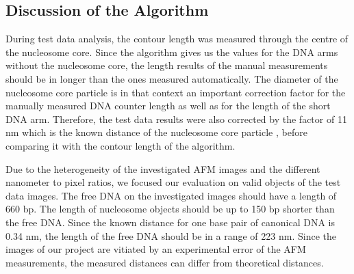\documentclass{article}
\begin{document}
\subsection{Discussion of the Algorithm}
During test data analysis, the contour length was measured through the centre of the nucleosome core. Since the algorithm gives us the values for the DNA arms without the nucleosome core, the length results of the manual measurements should be in longer than the ones measured automatically. The diameter of the nucleosome core particle is in that context an important correction factor for the manually measured DNA counter length as well as for the length of the short DNA arm. Therefore, the test data results were also corrected by the factor of 11 nm which is the known distance of the nucleosome core particle \cite{bussiek2007organisation}, \cite{davey2002solvent} before comparing it with the contour length of the algorithm.

Due to the heterogeneity of the investigated AFM images and the different nanometer to pixel ratios, we focused our evaluation on valid objects of the test data images. The free DNA on the investigated images should have a length of 660 bp. The length of nucleosome objects should be up to 150 bp shorter than the free DNA.  Since the known distance for one base pair of canonical DNA is 0.34 nm, the length of the free DNA should be in a range of 223 nm. Since the images of our project are vitiated by an experimental error of the AFM measurements, the measured distances can differ from theoretical distances.
\end{document}
